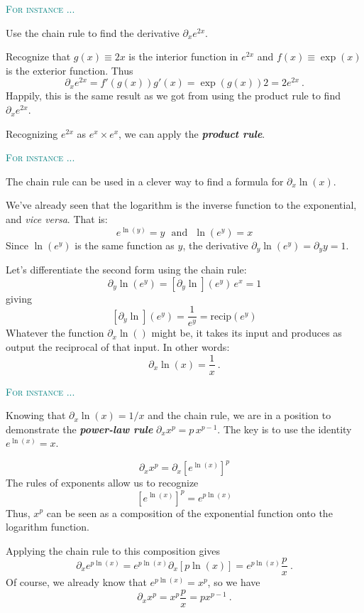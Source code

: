\documentclass[
  letterpaper,
  DIV=11,
  numbers=noendperiod,
  oneside]{scrreprt}
\newenvironment{example}%
{%
\textcolor{teal}{\hrulefill}%
  \par\vspace{.3\baselineskip}%
  \textcolor{teal}{\scshape For instance ...}%
  \par\vspace{\baselineskip}%
}%
{\textcolor{teal}{\hrulefill}}
\newcommand{\recip}{\text{recip}}
\begin{document}
\begin{example}
Use the chain rule to find the derivative \(\partial_x e^{2x}\).

Recognize that \(g(x) \equiv 2x\) is the interior function in \(e^{2x}\)
and \(f(x) \equiv \exp(x)\) is the exterior function. Thus
\[\partial_x e^{2x} = f'(g(x)) g'(x) = \exp(g(x)) 2 = 2 e^{2x}\ .\]
Happily, this is the same result as we got from using the product rule
to find \(\partial_x e^{2x}\).

Recognizing \(e^{2x}\) as \(e^x \times e^x\), we can apply the
\textbf{\emph{product rule}}.

\end{example}

\begin{example}
The chain rule can be used in a clever way to find a formula for
\(\partial_x \ln(x)\).

We've already seen that the logarithm is the inverse function to the
exponential, and \emph{vice versa}. That is:
\[e^{\ln(y)} = y \ \ \ \text{and}\ \ \ \ln(e^y) = x\] Since \(\ln(e^y)\)
is the same function as \(y\), the derivative
\(\partial_y \ln(e^y) = \partial_y y = 1\).

Let's differentiate the second form using the chain rule:
\[\partial_y \ln(e^y) = \left[\partial_y \ln\right](e^y)\, e^x = 1\]
giving
\[\left[\partial_y \ln\right](e^y) = \frac{1}{e^y} = \recip(e^y)\]
Whatever the function \(\partial_x \ln()\) might be, it takes its input
and produces as output the reciprocal of that input. In other words:
\[\partial_x \ln(x) = \frac{1}{x}\ .\]

\end{example}

\begin{example}
Knowing that \(\partial_x \ln(x) = 1/x\) and the chain rule, we are in a
position to demonstrate the \textbf{\emph{power-law rule}}
\(\partial_x x^p = p\, x^{p-1}\). The key is to use the identity
\(e^{\ln(x)} = x\).

\[\partial_x x^p = \partial_x \left[e^{\ln(x)}\right]^p\] The rules of
exponents allow us to recognize
\[\left[e^{\ln(x)}\right]^p = e^{p \ln(x)}\] Thus, \(x^p\) can be seen
as a composition of the exponential function onto the logarithm
function.

Applying the chain rule to this composition gives
\[\partial_x e^{p \ln(x)} = e^{p\ln(x)}\partial_x [p \ln(x)] =
e^{p\ln(x)} \frac{p}{x}\ .\] Of course, we already know that
\(e^{p \ln(x)} = x^p\), so we have
\[\partial_x x^p = x^p \frac{p}{x} = p x^{p-1}\ .\]

\end{example}
\end{document}
